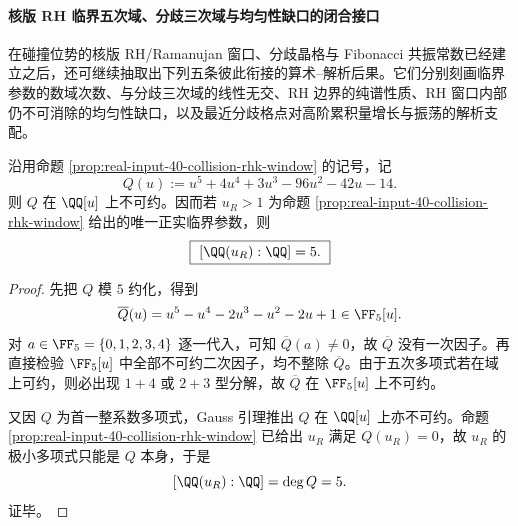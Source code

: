 \paragraph{核版 RH 临界五次域、分歧三次域与均匀性缺口的闭合接口}
在碰撞位势的核版 RH/Ramanujan 窗口、分歧晶格与 Fibonacci 共振常数已经建立之后，还可继续抽取出下列五条彼此衔接的算术--解析后果。它们分别刻画临界参数的数域次数、与分歧三次域的线性无交、RH 边界的纯谱性质、RH 窗口内部仍不可消除的均匀性缺口，以及最近分歧格点对高阶累积量增长与振荡的解析支配。

\begin{theorem}[核版 RH 临界参数生成五次域]\label{thm:xi-time-part9pb-rh-critical-quintic-field}
沿用命题 \ref{prop:real-input-40-collision-rhk-window} 的记号，记
\[
Q(u):=u^5+4u^4+3u^3-96u^2-42u-14.
\]
则 \(Q\) 在 \(\QQ[u]\) 上不可约。因而若 \(u_R>1\) 为命题
\ref{prop:real-input-40-collision-rhk-window} 给出的唯一正实临界参数，则
\[
\boxed{\ [\QQ(u_R):\QQ]=5.\ }
\]
\end{theorem}
\begin{proof}
先把 \(Q\) 模 \(5\) 约化，得到
\[
\overline Q(u)=u^5-u^4-2u^3-u^2-2u+1\in \FF_5[u].
\]
对 \(a\in\FF_5=\{0,1,2,3,4\}\) 逐一代入，可知 \(\overline Q(a)\neq 0\)，故
\(\overline Q\) 没有一次因子。再直接检验 \(\FF_5[u]\) 中全部不可约二次因子，均不整除 \(\overline Q\)。由于五次多项式若在域上可约，则必出现 \(1+4\) 或 \(2+3\) 型分解，故 \(\overline Q\) 在 \(\FF_5[u]\) 上不可约。

又因 \(Q\) 为首一整系数多项式，Gauss 引理推出 \(Q\) 在 \(\QQ[u]\) 上亦不可约。命题 \ref{prop:real-input-40-collision-rhk-window} 已给出 \(u_R\) 满足 \(Q(u_R)=0\)，故 \(u_R\) 的极小多项式只能是 \(Q\) 本身，于是
\[
[\QQ(u_R):\QQ]=\deg Q=5.
\]
证毕。
\end{proof}

